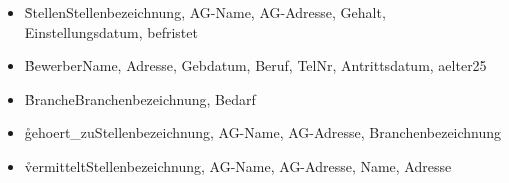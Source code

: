 \documentclass{lehramt-informatik-aufgabe}
\begin{document}
\begin{itemize}
\item \r{Stellen}{Stellenbezeichnung, AG-Name, AG-Adresse, Gehalt,
Einstellungsdatum, befristet}

\item \r{Bewerber}{Name, Adresse, Gebdatum, Beruf, TelNr,
Antrittsdatum, aelter25}

\item \r{Branche}{Branchenbezeichnung, Bedarf}

\item \r{gehoert\_zu}{Stellenbezeichnung, AG-Name, AG-Adresse,
Branchenbezeichnung}

\item \r{vermittelt}{Stellenbezeichnung, AG-Name, AG-Adresse,
Name, Adresse}
\end{itemize}
\end{document}
